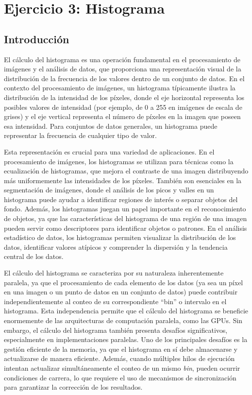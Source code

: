\chapter{Ejercicio 3: Histograma}

\section{Introducción}

    El cálculo del histograma es una operación fundamental en el procesamiento de imágenes y el análisis de datos, que proporciona una representación visual de la distribución de la frecuencia de los valores dentro de un conjunto de datos. En el contexto del procesamiento de imágenes, un histograma típicamente ilustra la distribución de la intensidad de los píxeles, donde el eje horizontal representa los posibles valores de intensidad (por ejemplo, de 0 a 255 en imágenes de escala de grises) y el eje vertical representa el número de píxeles en la imagen que poseen esa intensidad. Para conjuntos de datos generales, un histograma puede representar la frecuencia de cualquier tipo de valor.
    
    Esta representación es crucial para una variedad de aplicaciones. En el procesamiento de imágenes, los histogramas se utilizan para técnicas como la ecualización de histogramas, que mejora el contraste de una imagen distribuyendo más uniformemente las intensidades de los píxeles. También son esenciales en la segmentación de imágenes, donde el análisis de los picos y valles en un histograma puede ayudar a identificar regiones de interés o separar objetos del fondo. Además, los histogramas juegan un papel importante en el reconocimiento de objetos, ya que las características del histograma de una región de una imagen pueden servir como descriptores para identificar objetos o patrones. En el análisis estadístico de datos, los histogramas permiten visualizar la distribución de los datos, identificar valores atípicos y comprender la dispersión y la tendencia central de los datos.
    
    El cálculo del histograma se caracteriza por su naturaleza inherentemente paralela, ya que el procesamiento de cada elemento de los datos (ya sea un píxel en una imagen o un punto de datos en un conjunto de datos) puede contribuir independientemente al conteo de su correspondiente ``bin'' o intervalo en el histograma. Esta independencia permite que el cálculo del histograma se beneficie enormemente de las arquitecturas de computación paralela, como las GPUs. Sin embargo, el cálculo del histograma también presenta desafíos significativos, especialmente en implementaciones paralelas. Uno de los principales desafíos es la gestión eficiente de la memoria, ya que el histograma en sí debe almacenarse y actualizarse de manera eficiente. Además, cuando múltiples hilos de ejecución intentan actualizar simultáneamente el conteo de un mismo \textit{bin}, pueden ocurrir condiciones de carrera, lo que requiere el uso de mecanismos de sincronización para garantizar la corrección de los resultados.
    
